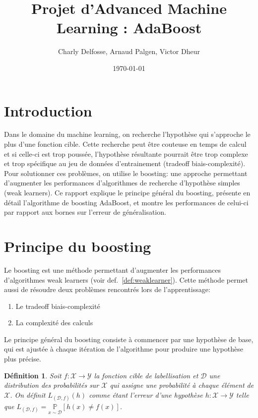 \documentclass[12pt]{article}
\title{Projet d'Advanced Machine Learning : AdaBoost}
\date{\today}
\author{Charly Delfosse, Arnaud Palgen, Victor Dheur}
\newtheorem{definition}{Définition}
\begin{document}
	\maketitle
	
	\section*{Introduction}
	
	Dans le domaine du machine learning, on recherche l'hypothèse qui s'approche le plus d'une fonction
	cible. Cette recherche peut être couteuse en temps de calcul et si celle-ci est trop poussée, 
	l'hypothèse résultante pourrait être trop complexe et trop spécifique au jeu de données
	d'entrainement (tradeoff biais-complexité). Pour solutionner ces problèmes, on utilise le 
	boosting: une approche permettant d'augmenter les performances d'algorithmes de recherche 
	d'hypothèse simples (weak learners). Ce rapport explique le principe général du boosting,
	présente en détail l'algorithme de boosting AdaBoost, et montre
	les performances de celui-ci par rapport aux bornes sur l'erreur de généralisation.
	
	\section{Principe du boosting}
	
	Le boosting est une méthode permettant d'augmenter les performances\\ d'algorithmes weak learners
	(voir def.~\ref{def:weaklearner}). Cette méthode permet aussi de résoudre deux problèmes
	rencontrés lors de l'apprentissage:
	\begin{enumerate}
		\item Le tradeoff biais-complexité
		\item La complexité des calculs
	\end{enumerate}
	
	Le principe général du boosting consiste à commencer par une hypothèse de base,
	qui est ajustée à chaque itération de l'algorithme pour produire une hypothèse plus précise.
	
	\begin{definition}
	Soit $f: \mathcal{X} \rightarrow \mathcal{Y}$ la fonction cible de labellisation et $\mathcal{D}$
	une distribution des probabilités sur $\mathcal{X}$ qui assigne une probabilité à chaque élément
	de $\mathcal{X}$. On définit $L_{(\mathcal{D},f)}(h)$ comme étant l'erreur d'une hypothèse
	$h: \mathcal{X} \rightarrow \mathcal{Y}$ telle que
	$L_{(\mathcal{D},f)} = \underset{x \sim \mathcal{D}}{\mathbb{P}} [h(x) \neq f(x)]$.
	\end{definition}	
	
\end{document}
